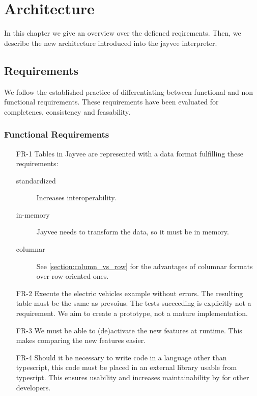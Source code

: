 \chapter{Architecture}
\label{chapter:Architecture}

In this chapter we give an overview over the defiened reqirements.
Then, we describe the new architecture introduced into the jayvee interpreter.

\section{Requirements}
\label{section:Requirements}

We follow the established practice of differentiating between functional and non functional requirements.
These requirements have been evaluated for completenes, consistency and feasability.

\subsection{Functional Requirements}
\label{subsection:FunctionalRequirements}

\begin{enumerate}
	\item[FR-1] Tables in Jayvee are represented with a data format fulfilling these requirements:
	      \begin{description}
		      \item[standardized] Increases interoperability.
		      \item[in-memory] Jayvee needs to transform the data, so it must be in memory.
		      \item[columnar] See \ref{section:column_vs_row} for the advantages of columnar formats over row-oriented ones.
	      \end{description}
	\item[FR-2] Execute the electric vehicles example without errors.
	      The resulting table must be the same as prevoius.
	      The tests succeeding %
	      is explicitly not a requirement.
	      We aim to create a prototype, not a mature implementation.
	\item[FR-3]\label{fr:runtime} We must be able to (de)activate the new features at runtime.
	      This makes comparing the new features easier. %
	\item[FR-4] Should it be necessary to write code in a language other than typescript, this code must be placed in an external library usable from typesript.
	      This ensures usability and increases maintainability by for other developers.
\end{enumerate}

